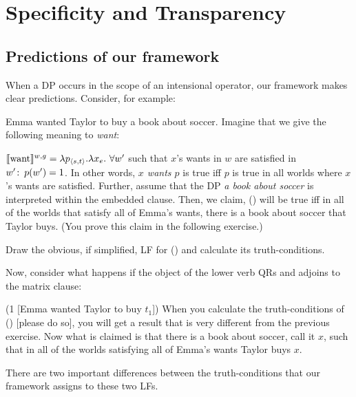 \setcounter{chapter}{4}
\chapter{Specificity and Transparency}


\minitoc

\section{Predictions of our framework}
\label{sec:predictions}

When a DP occurs in the scope of an intensional operator, our framework makes
clear predictions. Consider, for example:

\ex
Emma wanted Taylor to buy a book about soccer.
\xe
%
Imagine that we give the following meaning to \emph{want}:

\ex
$\llbracket \mbox{want} \rrbracket^{w,g} = \lambda p_{\langle s,t \rangle}.\lambda x_e.\ \forall w'$ such that
$x$'s wants in $w$ are satisfied in $w'\colon\thinspace p(w')=1$. 
\xe
%
In other words, \emph{$x$ wants $p$} is true iff $p$ is true in all worlds where
$x$'s wants are satisfied. Further, assume that the DP \emph{a book about
  soccer} is interpreted within the embedded clause. Then, we claim, (\blastx)
will be true iff in all of the worlds that satisfy all of Emma's wants, there is
a book about soccer that Taylor buys. (You prove this claim in the following
exercise.)

\begin{exercise}
  Draw the obvious, if simplified, LF for (\blastx) and calculate its
  truth-conditions. \eex
\end{exercise}
%
Now, consider what happens if the object of the lower verb QRs and adjoins to
the matrix clause:

\ex{} (1 [Emma wanted Taylor to buy $t_1$])
\xe
%
When you calculate the truth-conditions of (\lastx) [please do so], you will get
a result that is very different from the previous exercise. Now what is claimed
is that there is a book about soccer, call it $x$, such that in all of the
worlds satisfying all of Emma's wants Taylor buys $x$.

There are two important differences between the truth-conditions that our framework
assigns to these two LFs.

